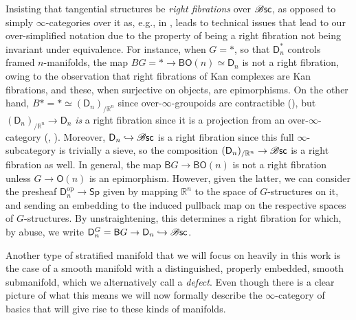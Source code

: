 \documentclass[../text]{subfiles}
\begin{document}
\begin{remark}\label{16GY5V1}
    Insisting that tangential structures be \emph{right fibrations} over $\mathscr{B} \mathsf{sc}$, as opposed to simply $\infty$-categories over it as, e.g., in \cite{ayala2020factorization}, leads to technical issues that lead to our over-simplified notation due to the property of being a right fibration not being invariant under equivalence. For instance, when $G=\ast$, so that $\mathsf{D}^\ast_n$ controls framed $n$-manifolds, the map $BG=\ast\to \mathsf{BO}(n)\simeq\mathsf{D}_n$ is not a right fibration, owing to the observation that right fibrations of Kan complexes are Kan fibrations, and these, when surjective on objects, are epimorphisms. On the other hand, $B\ast=\ast\simeq (\mathsf{D}_n)_{/\mathbb{R}^n}$ since over-$\infty$-groupoids are contractible (\cite[\href{https://kerodon.net/tag/018Y}{018Y}]{lurie_kerodon}), but $(\mathsf{D}_n)_{/\mathbb{R}^n}\to \mathsf{D}_n$ \emph{is} a right fibration since it is a projection from an over-$\infty$-category (\cite[\href{https://kerodon.net/tag/018F}{018F}]{lurie_kerodon}, \cite{joyal}). Moreover, $\mathsf{D}_n\hookrightarrow \mathscr{B} \mathsf{sc}$ is a right fibration since this full $\infty$-subcategory is trivially a sieve, so the composition $(\mathsf{D}_n)_{/\mathbb{R}^n}\to \mathscr{B} \mathsf{sc}$ is a right fibration as well. In general, the map $\mathsf{B}G\to \mathsf{BO}(n)$ is not a right fibration unless $G\to\mathsf{O}(n)$ is an epimorphism. However, given the latter, we can consider the presheaf $\mathsf{D}_n^{\text{op}}\to\mathsf{Sp}$ given by mapping $\mathbb{R}^n$ to the space of $G$-structures on it, and sending an embedding to the induced pullback map on the respective spaces of $G$-structures. By unstraightening, this determines a right fibration for which, by abuse, we write $\mathsf{D}^G_n=\mathsf{B}G\to \mathsf{D}_n\hookrightarrow\mathscr{B} \mathsf{sc}$.
\end{remark}

Another type of stratified manifold that we will focus on heavily in this work is the case of a smooth manifold with a distinguished, properly embedded, smooth submanifold, which we alternatively call a \emph{defect}. Even though there is a clear picture of what this means we will now formally describe the $\infty$-category of basics that will give rise to these kinds of manifolds.
\end{document}
